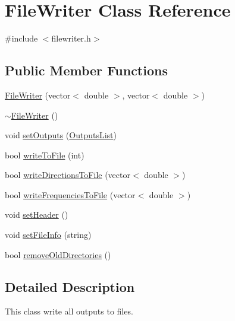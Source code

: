 \hypertarget{class_file_writer}{\section{File\-Writer Class Reference}
\label{class_file_writer}
}


{\ttfamily \#include $<$filewriter.\-h$>$}

\subsection*{Public Member Functions}
\begin{DoxyCompactItemize}
\item 
\hyperlink{class_file_writer_a709e25c5a60904cb5ab6e756f8580adb}{File\-Writer} (vector$<$ double $>$, vector$<$ double $>$)
\item 
\hyperlink{class_file_writer_ae5490307dcaf9237f4c1b8b8df433e03}{$\sim$\-File\-Writer} ()
\item 
void \hyperlink{class_file_writer_a12fb8cd23937a257e4db0bfade0b2480}{set\-Outputs} (\hyperlink{class_outputs_list}{Outputs\-List})
\item 
bool \hyperlink{class_file_writer_ada65187529c9aceb2be0a66085b745c5}{write\-To\-File} (int)
\item 
bool \hyperlink{class_file_writer_a692853a3380d47586fdc186ca3e62a45}{write\-Directions\-To\-File} (vector$<$ double $>$)
\item 
bool \hyperlink{class_file_writer_a5dd1b1384aac1febb75c21194e43f29e}{write\-Frequencies\-To\-File} (vector$<$ double $>$)
\item 
void \hyperlink{class_file_writer_aeea3ca877f0c5280b22ea7ff653db233}{set\-Header} ()
\item 
void \hyperlink{class_file_writer_aa01e35cc83c9ddee419c2b08cf12e919}{set\-File\-Info} (string)
\item 
bool \hyperlink{class_file_writer_a3c651fa84b2cce465f2ec0fce8be2464}{remove\-Old\-Directories} ()
\end{DoxyCompactItemize}


\subsection{Detailed Description}
This class write all outputs to files. 

